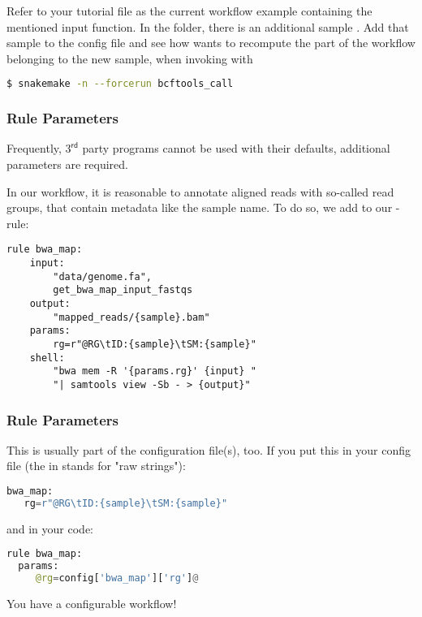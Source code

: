 \begin{frame}[fragile]
  \frametitle{}
  \begin{task}
  	 Refer to your tutorial file  as the current workflow example containing the mentioned input function.\newline
  	 In the  folder, there is an additional sample . Add that sample to the config file and see how \Snakemake{} wants to recompute the part of the workflow belonging to the new sample, when invoking with 
  	 \begin{lstlisting}[language=Bash, style=Shell]
$ snakemake -n --forcerun bcftools_call
  	 \end{lstlisting}
  \end{task}
\end{frame}

\begin{frame}[fragile]
  \frametitle{Rule Parameters}
  \begin{warning}
  	Frequently, $3^\mathsf{rd}$ party programs cannot be used with their defaults, additional parameters are required.
  \end{warning}
  In our workflow, it is reasonable to annotate aligned reads with so-called read groups, that contain metadata like the sample name. \newline
  To do so, we add to our -rule:
  \begin{lstlisting}[style=Plain,basicstyle=\small]
rule bwa_map:
    input:
        "data/genome.fa",
        get_bwa_map_input_fastqs
    output:
        "mapped_reads/{sample}.bam"
    params:
        rg=r"@RG\tID:{sample}\tSM:{sample}"
    shell:
        "bwa mem -R '{params.rg}' {input} "
        "| samtools view -Sb - > {output}"
  \end{lstlisting}
\end{frame}

\begin{frame}[fragile]
  \frametitle{Rule Parameters}
  This is usually part of the configuration file(s), too.\newline
  If you put this in your config file (the  in  stands for "raw strings"):
  \begin{lstlisting}[language=Python,style=Python]
bwa_map:
   rg=r"@RG\tID:{sample}\tSM:{sample}"
  \end{lstlisting}
  and in your code:
  \begin{lstlisting}[language=Python,style=Python]
rule bwa_map:
  params:
     @rg=config['bwa_map']['rg']@
  \end{lstlisting}
  You have a configurable workflow!
\end{frame}

